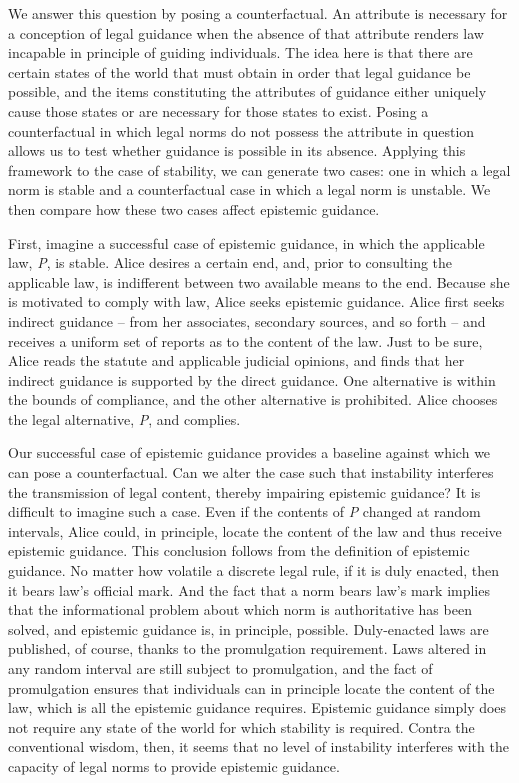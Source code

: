 We answer this question by posing a counterfactual. An attribute is
necessary for a conception of legal guidance when the absence of that
attribute renders law incapable in principle of guiding individuals. The
idea here is that there are certain states of the world that must obtain
in order that legal guidance be possible, and the items constituting the
attributes of guidance either uniquely cause those states or are
necessary for those states to exist. Posing a counterfactual in which
legal norms do not possess the attribute in question allows us to test
whether guidance is possible in its absence. Applying this framework to
the case of stability, we can generate two cases: one in which a legal
norm is stable and a counterfactual case in which a legal norm is
unstable. We then compare how these two cases affect epistemic guidance.

First, imagine a successful case of epistemic guidance, in which the
applicable law, \emph{P}, is stable. Alice desires a certain end, and,
prior to consulting the applicable law, is indifferent between two
available means to the end. Because she is motivated to comply with law,
Alice seeks epistemic guidance. Alice first seeks indirect guidance --
from her associates, secondary sources, and so forth -- and receives a
uniform set of reports as to the content of the law. Just to be sure,
Alice reads the statute and applicable judicial opinions, and finds that
her indirect guidance is supported by the direct guidance. One
alternative is within the bounds of compliance, and the other
alternative is prohibited. Alice chooses the legal alternative,
\emph{P}, and complies.

Our successful case of epistemic guidance provides a baseline against
which we can pose a counterfactual. Can we alter the case such that
instability interferes the transmission of legal content, thereby
impairing epistemic guidance? It is difficult to imagine such a case.
Even if the contents of \emph{P} changed at random intervals, Alice
could, in principle, locate the content of the law and thus receive
epistemic guidance. This conclusion follows from the definition of
epistemic guidance. No matter how volatile a discrete legal rule, if it
is duly enacted, then it bears law's official mark. And the fact that a
norm bears law's mark implies that the informational problem about which
norm is authoritative has been solved, and epistemic guidance is, in
principle, possible. Duly-enacted laws are published, of course, thanks
to the promulgation requirement. Laws altered in any random interval are
still subject to promulgation, and the fact of promulgation ensures that
individuals can in principle locate the content of the law, which is all
the epistemic guidance requires. Epistemic guidance simply does not
require any state of the world for which stability is required. Contra
the conventional wisdom, then, it seems that no level of instability
interferes with the capacity of legal norms to provide epistemic
guidance.

